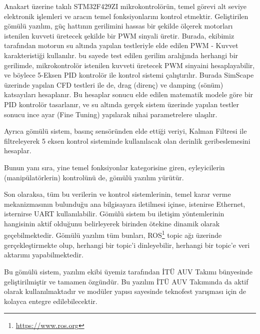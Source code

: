 \documentclass[12pt]{article}
\newcounter{subsubsubsection}[subsubsection]
\begin{document}

Anakart üzerine takılı STM32F429ZI mikrokontrolörün, temel görevi alt seviye elektronik işlemleri ve aracın temel fonksiyonlarını kontrol etmektir. Geliştirilen gömülü yazılım, güç hattının gerilimini hassas bir şekilde ölçerek motorları istenilen kuvveti üretecek şekilde bir PWM sinyali üretir. Burada, ekibimiz tarafından motorun su altında yapılan testleriyle elde edilen PWM - Kuvvet karakteristiği kullanılır. bu sayede test edilen gerilim aralığında herhangi bir gerilimde, mikrokontrolör istenilen kuvveti üretecek PWM sinyaini hesaplayabilir, ve böylece 5-Eksen PID kontrolör ile kontrol sistemi çalıştırılır. Burada SimScape üzerinde yapılan CFD testleri ile de, drag (direnç) ve damping (sönüm) katsayıları hesaplanır. Bu hesaplar sonucu elde edilen matematik modele göre bir PID kontrolör tasarlanır, ve su altında gerçek sistem üzerinde yapılan testler sonucu ince ayar (Fine Tuning) yapılarak nihai parametrelere ulaşılır. 

Ayrıca gömülü sistem, basınç sensöründen elde ettiği veriyi, Kalman Filtresi ile filtreleyerek 5 eksen kontrol sisteminde kullanılacak olan derinlik geribeslemesini hesaplar.


Bunun yanı sıra, yine temel fonksiyonlar kategorisine giren, eyleyicilerin (manipülatörlerin) kontrolünü de, gömülü yazılım yürütür.

Son olaraksa, tüm bu verilerin ve kontrol sistemlerinin, temel karar verme mekanizmasının bulunduğu ana bilgisayara iletilmesi içinse, istenirse Ethernet, isternirse UART kullanılabilir. Gömülü sistem bu iletişim yöntemlerinin hangisinin aktif olduğunu belirleyerek birinden ötekine dinamik olarak geçebilmektedir. Gömülü yazılım tüm bunları, ROS\footnote{\href{https://www.ros.org}{https://www.ros.org}} topic ağı üzerinde gerçekleştirmekte olup, herhangi bir topic'i dinleyebilir, herhangi bir topic'e veri aktarımı yapabilmektedir. 


Bu gömülü sistem, yazılım ekibi üyemiz tarafından İTÜ AUV Takımı bünyesinde geliştirilmiştir ve tamamen özgündür. Bu yazılım İTÜ AUV Takımında da aktif olarak kullanılmaktadır ve modüler yapısı sayesinde teknofest yarışması için de kolayca entegre edilebilecektir.  
\end{document}

